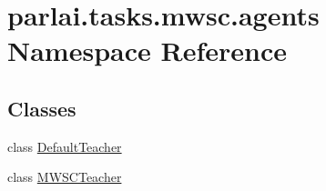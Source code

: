 \hypertarget{namespaceparlai_1_1tasks_1_1mwsc_1_1agents}{}\section{parlai.\+tasks.\+mwsc.\+agents Namespace Reference}
\label{namespaceparlai_1_1tasks_1_1mwsc_1_1agents}
\subsection*{Classes}
\begin{DoxyCompactItemize}
\item 
class \hyperlink{classparlai_1_1tasks_1_1mwsc_1_1agents_1_1DefaultTeacher}{Default\+Teacher}
\item 
class \hyperlink{classparlai_1_1tasks_1_1mwsc_1_1agents_1_1MWSCTeacher}{M\+W\+S\+C\+Teacher}
\end{DoxyCompactItemize}
